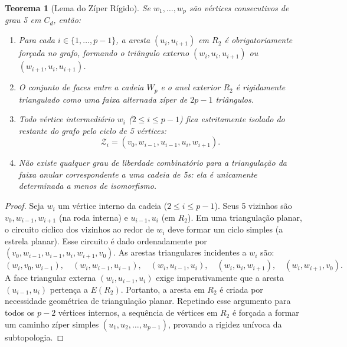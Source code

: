 \documentclass[11pt,a4paper]{article}
\theoremstyle{plain}
\newtheorem{theorem}{Teorema}[section]
\theoremstyle{definition}
\begin{document}
\begin{theorem}[Lema do Zíper Rígido]
Se $w_1, \dots, w_p$ são vértices consecutivos de grau 5 em $C_d$, então:
\begin{enumerate}
    \item Para cada $i \in \{1, \dots, p-1\}$, a aresta $(u_i, u_{i+1})$ em $R_2$ é obrigatoriamente forçada no grafo, formando o triângulo externo $(w_i, u_i, u_{i+1})$ ou $(w_{i+1}, u_i, u_{i+1})$.
    \item O conjunto de faces entre a cadeia $W_p$ e o anel exterior $R_2$ é rigidamente triangulado como uma faixa alternada zíper de $2p - 1$ triângulos.
    \item Todo vértice intermediário $w_i$ ($2 \le i \le p-1$) fica estritamente isolado do restante do grafo pelo ciclo de 5 vértices:
    \begin{equation}
    \mathcal{Z}_i = (v_0, w_{i-1}, u_{i-1}, u_i, w_{i+1}).
    \end{equation}
    \item Não existe qualquer grau de liberdade combinatório para a triangulação da faixa anular correspondente a uma cadeia de 5s: ela é unicamente determinada a menos de isomorfismo.
\end{enumerate}
\label{thm:zipper}
\end{theorem}

\begin{proof}
Seja $w_i$ um vértice interno da cadeia ($2 \le i \le p-1$). Seus 5 vizinhos são $v_0, w_{i-1}, w_{i+1}$ (na roda interna) e $u_{i-1}, u_i$ (em $R_2$). 
Em uma triangulação planar, o circuito cíclico dos vizinhos ao redor de $w_i$ deve formar um ciclo simples (a estrela planar). Esse circuito é dado ordenadamente por $(v_0, w_{i-1}, u_{i-1}, u_i, w_{i+1}, v_0)$.
As arestas triangulares incidentes a $w_i$ são:
\begin{equation}
(w_i, v_0, w_{i-1}), \quad (w_i, w_{i-1}, u_{i-1}), \quad (w_i, u_{i-1}, u_i), \quad (w_i, u_i, w_{i+1}), \quad (w_i, w_{i+1}, v_0).
\end{equation}
A face triangular externa $(w_i, u_{i-1}, u_i)$ exige imperativamente que a aresta $(u_{i-1}, u_i)$ pertença a $E(R_2)$. 
Portanto, a aresta em $R_2$ é criada por necessidade geométrica de triangulação planar. Repetindo esse argumento para todos os $p-2$ vértices internos, a sequência de vértices em $R_2$ é forçada a formar um caminho zíper simples $(u_1, u_2, \dots, u_{p-1})$, provando a rigidez unívoca da subtopologia.
\end{proof}
\end{document}
